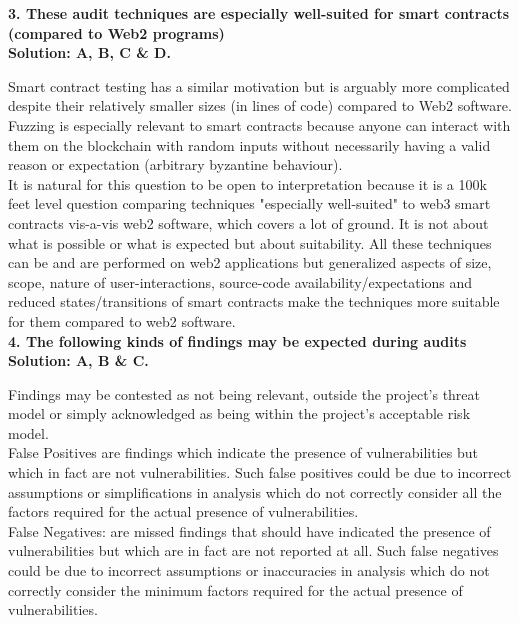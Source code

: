 \textbf{3. These audit techniques are especially well-suited for smart contracts (compared to Web2 programs)}\label{sec:exam6_q3}\\

\textbf{Solution: A, B, C \& D.}

Smart contract testing has a similar motivation but is arguably more complicated despite their relatively smaller sizes (in lines of code) compared to Web2 software.\\

Fuzzing is especially relevant to smart contracts because anyone can interact with them on the blockchain with random inputs without necessarily having a valid reason or expectation (arbitrary byzantine behaviour).\\

It is natural for this question to be open to interpretation because it is a 100k feet level question comparing techniques "especially well-suited" to web3 smart contracts vis-a-vis web2 software, which covers a lot of ground.
It is not about what is possible or what is expected but about suitability.
All these techniques can be and are performed on web2 applications but generalized aspects of size, scope, nature of user-interactions, source-code availability/expectations and reduced states/transitions of smart contracts make the techniques more suitable for them compared to web2 software.\\

\textbf{4. The following kinds of findings may be expected during audits}\label{sec:exam6_q4}\\

\textbf{Solution: A, B \& C.}

Findings may be contested as not being relevant, outside the project's threat model or simply acknowledged as being within the project's acceptable risk model.\\

False Positives are findings which indicate the presence of vulnerabilities but which in fact are not vulnerabilities.
Such false positives could be due to incorrect assumptions or simplifications in analysis which do not correctly consider all the factors required for the actual presence of vulnerabilities.\\

False Negatives: are missed findings that should have indicated the presence of vulnerabilities but which are in fact are not reported at all.
Such false negatives could be due to incorrect assumptions or inaccuracies in analysis which do not correctly consider the minimum factors required for the actual presence of vulnerabilities.\\

